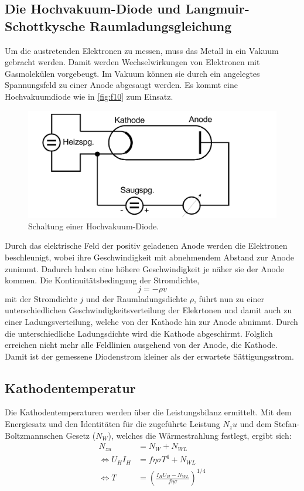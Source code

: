 \subsection{Die Hochvakuum-Diode und Langmuir-Schottkysche Raumladungsgleichung}
\label{sec:refdufotze}
Um die austretenden Elektronen zu messen, muss das Metall in ein Vakuum gebracht
werden. Damit werden Wechselwirkungen von Elektronen mit Gasmolekülen vorgebeugt. 
Im Vakuum können sie durch ein angelegtes Spannungsfeld zu einer Anode abgesaugt
werden. Es kommt eine Hochvakuumdiode wie in \autoref{fig:f10} zum Einsatz.
\begin{figure}[H]
    \centering
        \centering
        \includegraphics[width=\textwidth]{Bilder/schaltung.jpg}
        \caption{Schaltung einer Hochvakuum-Diode. \cite{anleitung4}}
    \hfill
    \label{fig:f10}
\end{figure}
\noindent Durch das elektrische Feld der positiv geladenen Anode werden die Elektronen
beschleunigt, wobei ihre Geschwindigkeit mit abnehmendem Abstand zur Anode
zunimmt. Dadurch haben eine höhere Geschwindigkeit je näher sie
der Anode kommen. Die Kontinuitätsbedingung der Stromdichte, 
\begin{equation}
j = -\rho v
\end{equation}
mit der Stromdichte $j$ und der Raumladungsdichte $\rho$, führt nun zu einer
unterschiedlichen Geschwindigkeitsverteilung der Elekrtonen und damit auch zu
einer Ladungsverteilung, welche von der Kathode hin zur Anode abnimmt. Durch
die unterschiedliche Ladungsdichte wird die Kathode abgeschirmt. Folglich erreichen 
nicht mehr alle Feldlinien ausgehend von der Anode, die Kathode. Damit ist der
gemessene Diodenstrom kleiner als der erwartete Sättigungsstrom.

\subsection{Kathodentemperatur}
\label{sec:kattemp}
Die Kathodentemperaturen werden über die Leistungsbilanz ermittelt. Mit dem 
Energiesatz und den Identitäten für die zugeführte Leistung $N_zu$ und dem 
Stefan-Boltzmannschen Gesetz ($N_W$), welches die Wärmestrahlung festlegt,
ergibt sich:
\begin{align*}
                         N_{zu} &= N_W + N_{WL} \\
    \Longleftrightarrow U_H I_H &= f \eta \sigma T^4 + N_{WL} \\
    \Longleftrightarrow       T &= \left(\frac{I_H U_H - N_{WL}}{f \eta \sigma}\right)^{1/4}
\end{align*}

